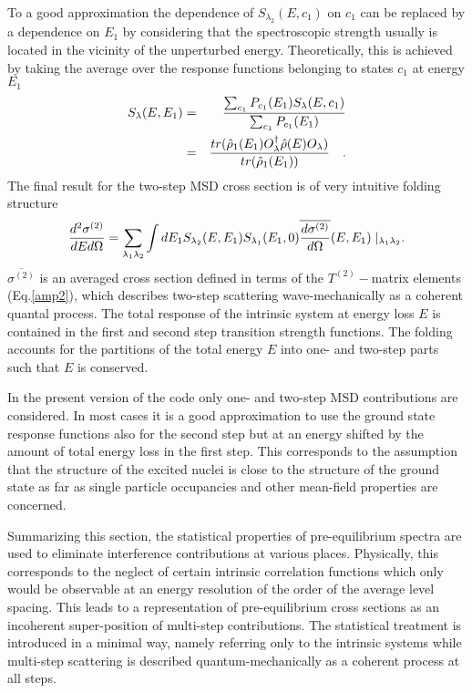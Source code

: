 To a good approximation the dependence of $S_{\lambda_{2}}(E,c_{1})$ on $%
c_{1}$ can be replaced by a dependence on $E_{1}$ by considering that the
spectroscopic strength usually is located in the vicinity of the unperturbed
energy. Theoretically, this is achieved by taking the average over the
response functions belonging to states $c_{1}$ at energy $E_{1}$ 
\begin{eqnarray}
S_{\lambda}(E,E_{1}) & = & \frac{\sum_{c_{1}}{P_{c_{1}}(E_{1})S_{%
\lambda}(E,c_{1})}}{\sum_{c_{1}}{P_{c_{1}}(E_{1})}}  \notag \\
& = & \frac{tr(\hat{\rho}_{1}(E_{1})O_{\lambda}^{\dag}\hat{\rho}%
(E)O_{\lambda})}{tr(\hat{\rho}_{1}(E_{1}))}\quad.  \label{slave}
\end{eqnarray}
\noindent The final result for the two-step MSD%
 cross section is of very intuitive folding structure 
\begin{equation}
\frac{d^{2}\sigma^{(2)}}{dEd\Omega}=\sum_{\lambda_{1}\lambda_{2}}{\int
dE_{1}S_{\lambda_{2}}(E,E_{1})S_{\lambda_{1}}(E_{1},0)\overline{\frac{%
d\sigma^{(2)}}{d\Omega}}(E,E_{1})\mid_{\lambda_{1}\lambda_{2}}}.
\label{sigma2}
\end{equation}
\noindent $\overline{\sigma^{(2)}}$ is an averaged cross section defined in
terms of the $T^{(2)}-$matrix elements (Eq.\ref{amp2}), which describes
two-step scattering wave-mechanically as a coherent quantal process. The
total response of the intrinsic system at energy loss $E$ is contained in
the first and second step transition strength functions. The folding
accounts for the partitions of the total energy $E$ into one- and two-step
parts such that $E$ is conserved.

In the present version of the code only one- and two-step MSD%
 contributions are considered. In most cases it is a good
approximation to use the ground state response functions also for the second
step but at an energy shifted by the amount of total energy loss in the
first step. This corresponds to the assumption that the structure of the
excited nuclei is close to the structure of the ground state as far as
single particle occupancies and other mean-field properties are concerned.

Summarizing this section, the statistical properties of pre-equilibrium
spectra are used to eliminate interference contributions at various places.
Physically, this corresponds to the neglect of certain intrinsic correlation
functions which only would be observable at an energy resolution of the
order of the average level spacing. This leads to a representation of
pre-equilibrium cross sections as an incoherent super-position of multi-step
contributions. The statistical treatment is introduced in a minimal way,
namely referring only to the intrinsic systems while multi-step scattering
is described quantum-mechanically as a coherent process at all steps.

